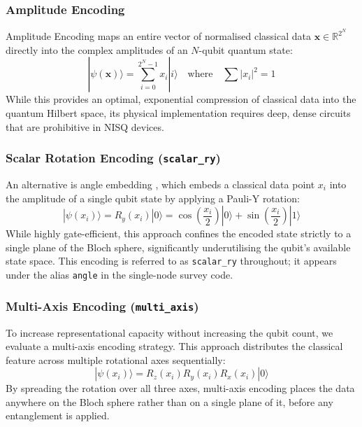 \documentclass[12pt, a4paper, oneside]{report}
\begin{document}
\subsubsection{Amplitude Encoding}
Amplitude Encoding \cite{amplitude_encoding} maps an entire vector of normalised classical data $\mathbf{x} \in \mathbb{R}^{2^N}$ directly into the complex amplitudes of an $N$-qubit quantum state:
\begin{equation}
    |\psi(\mathbf{x})\rangle = \sum_{i=0}^{2^N-1} x_i |i\rangle \quad \text{where} \quad \sum |x_i|^2 = 1
\end{equation}
While this provides an optimal, exponential compression of classical data into the quantum Hilbert space, its physical implementation requires deep, dense circuits that are prohibitive in NISQ devices.

\subsubsection{Scalar Rotation Encoding (\texttt{scalar\_ry})}
\label{sec:enc_scalar_ry}
An alternative is angle embedding \cite{angle_embedding}, which embeds a classical data point $x_i$ into the amplitude of a single qubit state by applying a Pauli-Y rotation:
\begin{equation}
    |\psi(x_i)\rangle = R_y(x_i) |0\rangle = \cos\left(\frac{x_i}{2}\right)|0\rangle + \sin\left(\frac{x_i}{2}\right)|1\rangle
\end{equation}
While highly gate-efficient, this approach confines the encoded state strictly to a single plane of the Bloch sphere, significantly underutilising the qubit's available state space. This encoding is referred to as \texttt{scalar\_ry} throughout; it appears under the alias \texttt{angle} in the single-node survey code.

\subsubsection{Multi-Axis Encoding (\texttt{multi\_axis})}
\label{sec:enc_multi_axis}
To increase representational capacity without increasing the qubit count, we evaluate a multi-axis encoding strategy. This approach distributes the classical feature across multiple rotational axes sequentially:
\begin{equation}
    |\psi(x_i)\rangle = R_z(x_i) R_y(x_i) R_x(x_i) |0\rangle
\end{equation}
By spreading the rotation over all three axes, multi-axis encoding places the data anywhere on the Bloch sphere rather than on a single plane of it, before any entanglement is applied.
\end{document}
